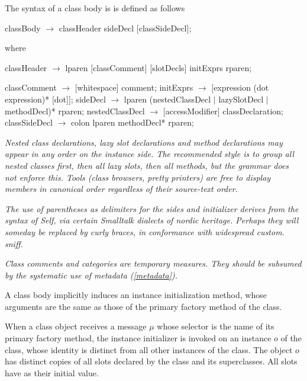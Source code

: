 \documentclass{article}
\begin{document}
The syntax of a class body is is defined as follows


\begin{newspeak}
classBody $\rightarrow$ classHeader sideDecl [classSideDecl];
\end{newspeak}
where

\begin{newspeak}
classHeader $\rightarrow$  lparen  [classComment] 
                        [slotDecls] initExprs  rparen;  

                                             
classComment  $\rightarrow$ [whitespace] comment;    
initExprs $\rightarrow$ [expression (dot expression)* [dot]];  
sideDecl $\rightarrow$ lparen (nestedClassDecl $|$ lazySlotDecl $|$ methodDecl)* rparen;
nestedClassDecl $\rightarrow$ [accessModifier] classDeclaration;
classSideDecl $\rightarrow$ colon lparen methodDecl* rparen;
\end{newspeak}

{\it
Nested class declarations, lazy slot declarations and method declarations may appear in any order on the instance side. The recommended style is to group all nested classes first, then all lazy slots, then all methods, but the grammar does not enforce this. Tools (class browsers, pretty printers) are free to display members in canonical order regardless of their source-text order.
}

 
 {\it
 The use of parentheses as delimiters for the sides and initializer derives from the syntax of Self, via certain Smalltalk dialects of nordic heritage. Perhaps they will  someday be replaced by curly braces, in conformance with widespread custom. sniff.
 }
 
{\it
 Class comments and categories are temporary measures. They should be subsumed by the systematic use of metadata (\ref{metadata}).
 }
 
A class body implicitly induces an instance initialization method, whose arguments are the same as those of the primary factory method of the class.
 
When a class object receives a message $\mu$ whose selector is the name of its primary factory method, the instance initializer is invoked on an instance $o$ of the class, whose identity is distinct from all other instances of the class. The object $o$ has distinct copies of all slots declared by the class and its superclasses. All slots have \NIL{} as their initial value. 
\end{document}
